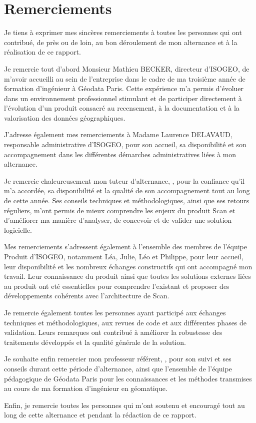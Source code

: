 
\chapter*{Remerciements}

Je tiens à exprimer mes sincères remerciements à toutes les personnes qui ont contribué, de près ou de loin, au bon déroulement de mon alternance et à la réalisation de ce rapport.

Je remercie tout d'abord Monsieur Mathieu BECKER, directeur d'ISOGEO, de m'avoir accueilli au sein de l'entreprise dans le cadre de ma troisième année de formation d'ingénieur à Géodata Paris.
Cette expérience m'a permis d'évoluer dans un environnement professionnel stimulant et de participer directement à l'évolution d'un produit consacré au recensement, à la documentation et à la valorisation des données géographiques.

J'adresse également mes remerciements à Madame Laurence DELAVAUD, responsable administrative d'ISOGEO, pour son accueil, sa disponibilité et son accompagnement dans les différentes démarches administratives liées à mon alternance.

Je remercie chaleureusement mon tuteur d'alternance, \ReportCompanyTutor, pour la confiance qu'il m'a accordée, sa disponibilité et la qualité de son accompagnement tout au long de cette année.
Ses conseils techniques et méthodologiques, ainsi que ses retours réguliers, m'ont permis de mieux comprendre les enjeux du produit Scan et d'améliorer ma manière d'analyser, de concevoir et de valider une solution logicielle.

Mes remerciements s'adressent également à l'ensemble des membres de l'équipe Produit d'ISOGEO, notamment Léa, Julie, Léo et Philippe, pour leur accueil, leur disponibilité et les nombreux échanges constructifs qui ont accompagné mon travail.
Leur connaissance du produit ainsi que toutes les solutions externes liées au produit ont eté essentielles pour comprendre l'existant et proposer des développements cohérents avec l'architecture de Scan.

Je remercie également toutes les personnes ayant participé aux échanges techniques et méthodologiques, aux revues de code et aux différentes phases de validation.
Leurs remarques ont contribué à améliorer la robustesse des traitements développés et la qualité générale de la solution.

Je souhaite enfin remercier mon professeur référent, \ReportAcademicTutor, pour son suivi et ses conseils durant cette période d'alternance, ainsi que l'ensemble de l'équipe pédagogique de Géodata Paris pour les connaissances et les méthodes transmises au cours de ma formation d'ingénieur en géomatique.

Enfin, je remercie toutes les personnes qui m'ont soutenu et encouragé tout au long de cette alternance et pendant la rédaction de ce rapport.

